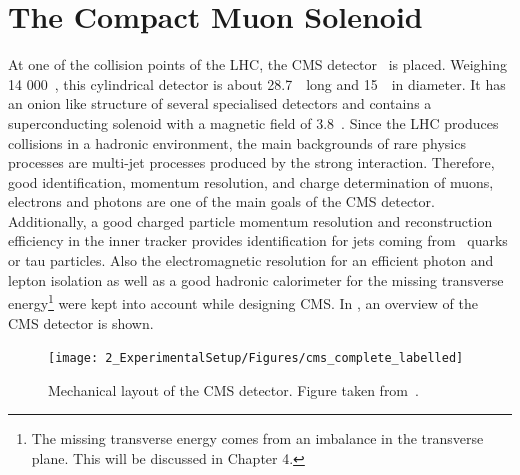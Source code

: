 \section{The Compact Muon Solenoid}
\label{sec:CMS}
At one of the collision points of the LHC, the CMS detector~\cite{CMS,Bayatian:922757} is placed. Weighing 14 000~\tonne, this cylindrical detector is about 28.7~\meter\ long and 15~\meter\ in diameter. It has an onion like structure of several specialised detectors and contains a superconducting solenoid with a magnetic field of 3.8~\Tesla. Since the LHC produces collisions in a hadronic environment,  the main backgrounds of rare physics processes are  multi-jet processes produced by the strong interaction. Therefore, good identification, momentum resolution, and charge determination of muons, electrons and photons are one of the main goals of the CMS detector. Additionally, a good charged particle momentum resolution and reconstruction efficiency in the inner tracker provides identification for jets coming from \Pbottom\ quarks or tau particles. Also the electromagnetic resolution for an efficient photon and lepton isolation as well as a good hadronic calorimeter for the missing transverse energy\footnote{The missing transverse energy comes from an imbalance in the transverse plane. This will be discussed in Chapter 4.} were kept into account while designing CMS. In , an overview of the CMS detector is shown. 
\begin{figure}[htbp]
	\centering
	\texttt{[image: 2\_ExperimentalSetup/Figures/cms\_complete\_labelled]}
	\caption{Mechanical layout of the CMS detector. Figure taken from~\cite{CMSdraw}.}
	\label{fig:CMS}
\end{figure}

\newpage
